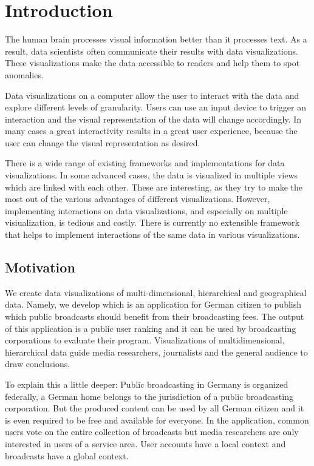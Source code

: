 \chapter{Introduction}
The human brain processes visual information better than it processes text.
As a result, data scientists often communicate their results with data visualizations.
These visualizations make the data accessible to readers and help them to spot anomalies.

Data visualizations on a computer allow the user to interact with the data and explore different levels of granularity.
Users can use an input device to trigger an interaction and the visual representation of the data will change accordingly.
In many cases a great interactivity results in a great user experience, because the user can change the visual representation as desired.

There is a wide range of existing frameworks and implementations for data visualizations.
In some advanced cases, the data is visualized in multiple views which are linked with each other.
These \cmvs{} are interesting, as they try to make the most out of the various advantages of different visualizations.
However, implementing interactions on data visualizations, and especially on multiple visiualization, is tedious and costly.
There is currently no extensible framework that helps to implement interactions of the same data in various visualizations.


\section{Motivation}\label{sec:outline}

We create data visualizations of multi-dimensional, hierarchical and geographical data.
Namely, we develop \rufu{} which is an application for German citizen to publish which public broadcasts should benefit from their broadcasting fees.
The output of this application is a public user ranking and it can be used by broadcasting corporations to evaluate their program.
Visualizations of multidimensional, hierarchical data guide media researchers, journalists and the general audience to draw conclusions.

To explain this a little deeper:
Public broadcasting in Germany is organized federally, a German home belongs to the jurisdiction of a public broadcasting corporation.
But the produced content can be used by all German citizen and it is even required to be free and available for everyone.
In the application, common users vote on the entire collection of broadcasts but media researchers are only interested in users of a service area.
User accounts have a local context and broadcasts have a global context.

